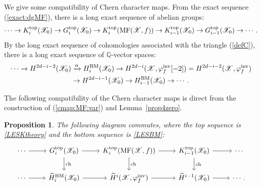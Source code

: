 \documentclass [11pt,oneside,a4paper,mathscr]{amsart}
\newtheorem{prop}[thm]{Proposition}
\theoremstyle{definition}
\newcommand{\X}{\mathscr{X}}
\begin{document}

We give some compatibility of Chern character maps. 
From the exact sequence (\ref{exact:dgMF}),
there is a long exact sequence of abelian groups:
\begin{equation}\label{LESKtheory}
\cdots\to K^{\mathrm{top}}_i(\X_0)\to G^{\mathrm{top}}_i(\X_0)\to K_i^{\rm{top}}(\mathrm{MF}(\X, f))\to K^{\mathrm{top}}_{i-1}(\X_0)\to G^{\mathrm{top}}_{i-1}(\X_0)\to\cdots.
\end{equation}
By the long exact sequence of cohomologies associated with the triangle (\ref{defC}), 
there is a long exact sequence of $\mathbb{Q}$-vector spaces:
\begin{align}\label{LESBM}
\cdots\to H^{2d-i-2}(\X_0)&\xrightarrow{\alpha} H^{\mathrm{BM}}_i(\X_0)\to H^{2d-i}(\X, \varphi_f^{\mathrm{inv}}[-2])= H^{2d-i-2}(\X, \varphi_f^{\mathrm{inv}})\\\notag&\to H^{2d-i-1}(\X_0)\to H^{\mathrm{BM}}_{i-1}(\X_0)\to\cdots.
\end{align}


The following compatibility of the Chern character maps
is direct from the construction of (\ref{cmap:MF:var})
and Lemma~\ref{prop4zero}. 

\begin{prop}\label{prop413}
    The following diagram commutes, where the top sequence is \eqref{LESKtheory} and the bottom sequence is \eqref{LESBM}:
    \begin{equation}\label{diagprop412}
        \begin{tikzcd}
           \cdots\arrow[r]& G^{\mathrm{top}}_i(\X_0)\arrow[d, "\mathrm{ch}"]\arrow[r]& K^{\mathrm{top}}_i(\mathrm{MF}(\X, f))\arrow[d, "\mathrm{ch}"]\arrow[r]& K^{\mathrm{top}}_{i-1}(\X_0)\arrow[d, "\mathrm{ch}"]\arrow[r]& \cdots\\
            \cdots\arrow[r]&\widetilde{H}^{\mathrm{BM}}_i(\X_0)\arrow[r]& \widetilde{H}^i(\X, \varphi_f^{\mathrm{inv}})\arrow[r]& \widetilde{H}^{i-1}(\X_0)\arrow[r]&\cdots.
        \end{tikzcd}
    \end{equation}
\end{prop}
\end{document}
